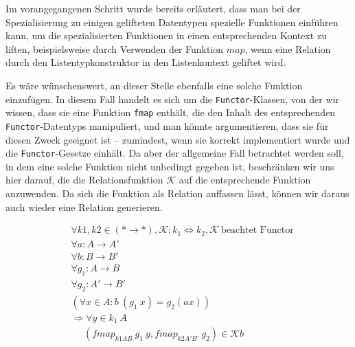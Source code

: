 Im vorangegangenen Schritt wurde bereits erläutert, dass man bei der Spezialisierung zu einigen gelifteten Datentypen
spezielle Funktionen einführen kann, um die spezialisierten Funktionen in einen entsprechenden Kontext zu liften, beispielsweise
durch Verwenden der Funktion $map$, wenn eine Relation durch den Listentypkonstruktor in den Listenkontext geliftet wird.

Es wäre wünschenswert, an dieser Stelle ebenfalls eine solche Funktion einzufügen. In diesem Fall handelt es sich um die
\texttt{Functor}-Klassen, von der wir wissen, dass sie eine Funktion \texttt{fmap} enthält, die den Inhalt des entsprechenden
\texttt{Functor}-Datentyps manipuliert, und man könnte argumentieren, dass sie für diesen Zweck geeignet ist -- zumindest, wenn sie
korrekt implementiert wurde und die \texttt{Functor}-Gesetze einhält. Da aber der allgemeine Fall betrachtet werden soll, in dem
eine solche Funktion nicht unbedingt gegeben ist, beschränken wir uns hier darauf, die
die Relationsfunktion $\mathcal{K}$ auf
die entsprechende Funktion anzuwenden. Da sich die Funktion als Relation auffassen lässt, können wir daraus auch wieder
eine Relation generieren.


%
\begin{align*}
&\forall k1, k2 \in (* \rightarrow *), \mathcal{K} : k_1 \Leftrightarrow k_2, \mathcal{K}~\text{beachtet Functor} \\
&\forall a : A \rightarrow A' \\
&\forall b : B \rightarrow B' \\
&\forall g_1 : A \rightarrow B\\
&\forall g_2 : A' \rightarrow B' \\
&(\forall x \in A : b\ (g_1\ x) = g_2 (a x))\\
&\Rightarrow \forall y \in k_1\ A\\
&\ \ \ \ \ \ (fmap_{k1 A B}\ g_1\ y, fmap_{k2 A' B'}\ g_2) \in \mathcal{K} b
\end{align*}

